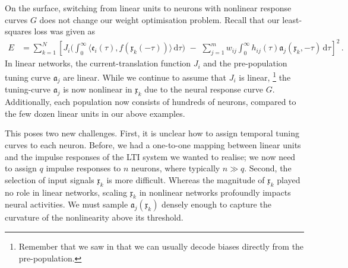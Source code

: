 On the surface, switching from linear units to neurons with nonlinear response curves $G$ does not change our weight optimisation problem.
Recall that our least-squares loss was given as
\begin{align}
	E &= \sum_{k = 1}^N \left[
		J_i \Big( \! \int_0^\infty \!\!\! \big\langle \mathfrak{e}_i(\tau), f(\mathfrak{x}_k(-\tau)) \big\rangle \, \mathrm{d}\tau \Big) \,\,-\,\,
		\sum_{j = 1}^m w_{ij} \! \int_0^\infty \!\!\! h_{ij}(\tau) \mathfrak{a}_j(\mathfrak{x}_k, -\tau) \,\mathrm{d}\tau
	\right]^2 \,.
	\tag{4.7}
\end{align}
In linear networks, the current-translation function $J_i$ and the pre-population tuning curve $\mathfrak{a}_j$ are linear.
While we continue to assume that $J_i$ is linear,%
\footnote{
Remember that we saw in  that we can usually decode biases directly from the pre-population.
}
the tuning-curve $\mathfrak{a}_j$ is now nonlinear in $\mathfrak{x}_k$ due to the neural response curve $G$.
Additionally, each population now consists of hundreds of neurons, compared to the few dozen linear units in our above examples.

This poses two new challenges.
First, it is unclear how to assign temporal tuning curves to each neuron.
Before, we had a one-to-one mapping between linear units and the impulse responses of the LTI system we wanted to realise; we now need to assign $q$ impulse responses to $n$ neurons, where typically $n \gg q$.
Second, the selection of input signals $\mathfrak{x}_k$ is more difficult.
Whereas the magnitude of $\mathfrak{x}_k$ played no role in linear networks, scaling $\mathfrak{x}_k$ in nonlinear networks profoundly impacts neural activities.
We must sample $\mathfrak{a}_j(\mathfrak{x}_k)$ densely enough to capture the curvature of the nonlinearity above its threshold.


